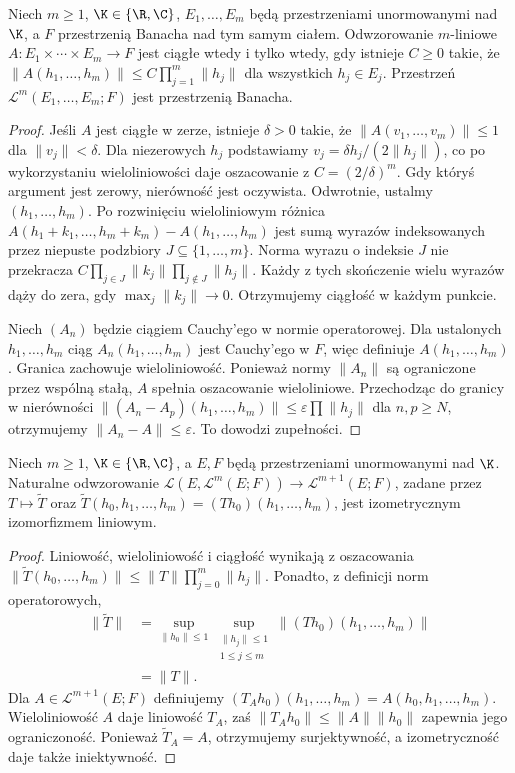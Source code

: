 \begin{stwierdzenie}
\label{prop:multi-banach15}
Niech $m\ge1$, $\K\in\{\R,\C\}$, $E_1,\ldots,E_m$ będą przestrzeniami unormowanymi nad $\K$, a $F$ przestrzenią Banacha nad tym samym ciałem. Odwzorowanie $m$-liniowe $A:E_1\times\cdots\times E_m\to F$ jest ciągłe wtedy i tylko wtedy, gdy istnieje $C\ge0$ takie, że
$\|A(h_1,\ldots,h_m)\|\le C\prod_{j=1}^m\|h_j\|$ dla wszystkich $h_j\in E_j$. Przestrzeń $\mathcal L^m(E_1,\ldots,E_m;F)$ jest przestrzenią Banacha.
\end{stwierdzenie}
\begin{proof}
Jeśli $A$ jest ciągłe w zerze, istnieje $\delta>0$ takie, że $\|A(v_1,\ldots,v_m)\|\le1$ dla $\|v_j\|<\delta$. Dla niezerowych $h_j$ podstawiamy $v_j=\delta h_j/(2\|h_j\|)$, co po wykorzystaniu wieloliniowości daje oszacowanie z $C=(2/\delta)^m$. Gdy któryś argument jest zerowy, nierówność jest oczywista. Odwrotnie, ustalmy $(h_1,\ldots,h_m)$. Po rozwinięciu wieloliniowym różnica $A(h_1+k_1,\ldots,h_m+k_m)-A(h_1,\ldots,h_m)$ jest sumą wyrazów indeksowanych przez niepuste podzbiory $J\subseteq\{1,\ldots,m\}$. Norma wyrazu o indeksie $J$ nie przekracza $C\prod_{j\in J}\|k_j\|\prod_{j\notin J}\|h_j\|$. Każdy z tych skończenie wielu wyrazów dąży do zera, gdy $\max_j\|k_j\|\to0$. Otrzymujemy ciągłość w każdym punkcie.

Niech $(A_n)$ będzie ciągiem Cauchy'ego w normie operatorowej. Dla ustalonych $h_1,\ldots,h_m$ ciąg $A_n(h_1,\ldots,h_m)$ jest Cauchy'ego w $F$, więc definiuje $A(h_1,\ldots,h_m)$. Granica zachowuje wieloliniowość. Ponieważ normy $\|A_n\|$ są ograniczone przez wspólną stałą, $A$ spełnia oszacowanie wieloliniowe. Przechodząc do granicy w nierówności $\|(A_n-A_p)(h_1,\ldots,h_m)\|\le\varepsilon\prod\|h_j\|$ dla $n,p\ge N$, otrzymujemy $\|A_n-A\|\le\varepsilon$. To dowodzi zupełności.
\end{proof}

\begin{lemat}
\label{lem:currying15}
Niech $m\ge1$, $\K\in\{\R,\C\}$, a $E,F$ będą przestrzeniami unormowanymi nad $\K$. Naturalne odwzorowanie
$\mathcal L(E,\mathcal L^m(E;F))\to\mathcal L^{m+1}(E;F)$, zadane przez $T\mapsto\widetilde T$ oraz $\widetilde T(h_0,h_1,\ldots,h_m)=(Th_0)(h_1,\ldots,h_m)$, jest izometrycznym izomorfizmem liniowym.
\end{lemat}
\begin{proof}
Liniowość, wieloliniowość i ciągłość wynikają z oszacowania $\|\widetilde T(h_0,\ldots,h_m)\|\le\|T\|\prod_{j=0}^m\|h_j\|$. Ponadto, z definicji norm operatorowych,
\[
\begin{aligned}
\|\widetilde T\|&=\sup_{\|h_0\|\le1}\sup_{\substack{\|h_j\|\le1\\1\le j\le m}}\|(Th_0)(h_1,\ldots,h_m)\|\\
&=\|T\|.
\end{aligned}
\]
Dla $A\in\mathcal L^{m+1}(E;F)$ definiujemy $(T_Ah_0)(h_1,\ldots,h_m)=A(h_0,h_1,\ldots,h_m)$. Wieloliniowość $A$ daje liniowość $T_A$, zaś $\|T_Ah_0\|\le\|A\|\|h_0\|$ zapewnia jego ograniczoność. Ponieważ $\widetilde T_A=A$, otrzymujemy surjektywność, a izometryczność daje także iniektywność.
\end{proof}

